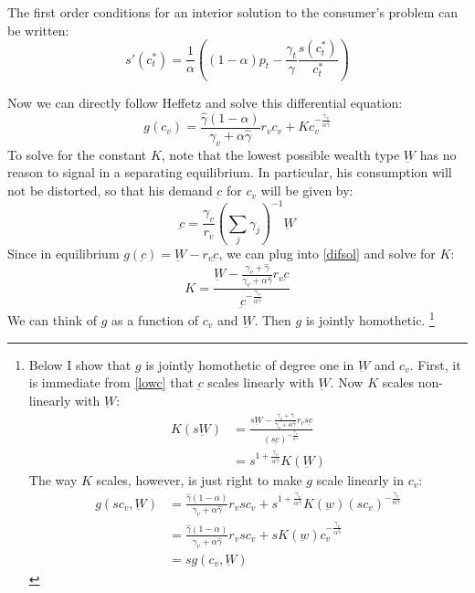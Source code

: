 \documentclass[12pt]{article}
\begin{document}
The first order conditions for an interior solution to the consumer's problem can be written:
\begin{equation}
	\label{foc}
s'(c_t^*) = \frac{1}{\alpha}\left( \left( 1-\alpha\right) p_t - \frac{\gamma_t}{\hat{\gamma}}\frac{s(c_t^*)}{c_t^*}\right)
\end{equation}

Now we can directly follow Heffetz and solve this differential equation:
\begin{equation}
	\label{difsol}
	g(c_v) = \frac{\hat{\gamma}\left(1-\alpha\right)}{\gamma_v +\alpha \hat{\gamma}} r_v c_v + K c_v^{-\frac{\gamma_v}{\alpha \hat{\gamma}}}
\end{equation}
To solve for the constant $K$, note that the lowest possible wealth type $\underbar{W}$ has no reason to signal in a separating equilibrium.
In particular, his consumption will not be distorted, so that his demand $\underbar{c}$ for $c_v$ will be given by:
\begin{equation}
	\label{lowc}
	\underbar{c} = \frac{\gamma_v}{r_v}\left(\sum_{j} \gamma_j\right)^{-1}\underbar{W} 
\end{equation}
Since in equilibrium $g(\underbar{c}) = \underbar{W} - r_v \underbar{c}$, we can plug into \eqref{difsol} and solve for $K$:
\[
K = \frac{\underbar{W}- \frac{\gamma_v + \hat{\gamma}}{\gamma_v + \alpha \hat{\gamma}}r_v \underbar{c}}{\underbar{c}^{-\frac{\gamma_v}{\alpha \hat{\gamma}}}}
\]
We can think of $g$ as a function of $c_v$ and $\underbar{W}$. 
Then $g$ is jointly homothetic.  
\footnote{
Below I show that $g$ is jointly homothetic of degree one in $\underbar{W}$ and $c_v$.  First, it is immediate from \eqref{lowc} that $\underbar{c}$ scales linearly with $\underbar{W}$.
Now $K$ scales non-linearly with $\underbar{W}$:
\begin{align*}
	K(s\underbar{W}) &= \frac{s\underbar{W}- \frac{\gamma_v + \hat{\gamma}}{\gamma_v + \alpha \hat{\gamma}}r_v s \underbar{c}}{(s\underbar{c})^{-\frac{\gamma_v}{\alpha \hat{\gamma}}}} \\
	&= s^{1 + \frac{\gamma_v}{\alpha \hat{\gamma}}}K(\underbar{W})
\end{align*}
The way $K$ scales, however, is just right to make $g$ scale linearly in $c_v$:
\begin{align*}
	g(s c_v,\underbar{W}) &= \frac{\hat{\gamma}\left(1-\alpha\right)}{\gamma_v +\alpha \hat{\gamma}} r_v s c_v + s^{1+\frac{\gamma_v}{\alpha \hat{\gamma}}} K(\underbar{w}) (s c_v)^{-\frac{\gamma_v}{\alpha \hat{\gamma}}} \\
	&= \frac{\hat{\gamma}\left(1-\alpha\right)}{\gamma_v +\alpha \hat{\gamma}} r_v s c_v + s K(\underbar{w}) c_v^{-\frac{\gamma_v}{\alpha \hat{\gamma}}} \\
	&= s g(c_v,\underbar{W})
\end{align*}
}
\end{document}
